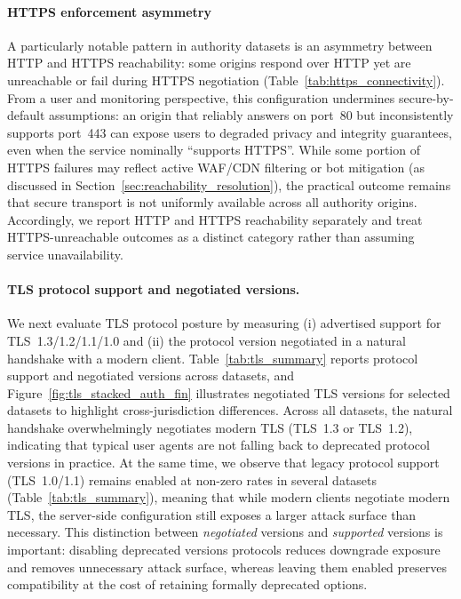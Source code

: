\documentclass[a4paper,fleqn]{cas-sc}
\begin{document}
  \paragraph{HTTPS enforcement asymmetry}
  A particularly notable pattern in authority datasets is an asymmetry between HTTP and HTTPS reachability: some origins respond over HTTP yet are unreachable or fail during HTTPS negotiation (Table~\ref{tab:https_connectivity}).
  From a user and monitoring perspective, this configuration undermines secure-by-default assumptions: an origin that reliably answers on port~80 but inconsistently supports port~443 can expose users to degraded privacy and integrity guarantees, even when the service nominally ``supports HTTPS''. 
  While some portion of HTTPS failures may reflect active WAF/CDN filtering or bot mitigation (as discussed in Section~\ref{sec:reachability_resolution}), the practical outcome remains that secure transport is not uniformly available across all authority origins.
  Accordingly, we report HTTP and HTTPS reachability separately and treat HTTPS-unreachable outcomes as a distinct category rather than assuming service unavailability.

\paragraph{TLS protocol support and negotiated versions.}
    We next evaluate TLS protocol posture by measuring 
    (i) advertised support for TLS~1.3/1.2/1.1/1.0 and 
    (ii) the protocol version negotiated in a natural handshake with a modern client. 
    Table~\ref{tab:tls_summary} reports protocol support and negotiated versions across datasets, and Figure~\ref{fig:tls_stacked_auth_fin} illustrates negotiated TLS versions for selected datasets to highlight cross-jurisdiction differences. 
    Across all datasets, the natural handshake overwhelmingly negotiates modern TLS (TLS~1.3 or TLS~1.2), indicating that typical user agents are not falling back to deprecated protocol versions in practice. 
    At the same time, we observe that legacy protocol support (TLS~1.0/1.1) remains enabled at non-zero rates in several datasets (Table~\ref{tab:tls_summary}), meaning that while modern clients negotiate modern TLS, the server-side configuration still exposes a larger attack surface than necessary. 
    This distinction between \emph{negotiated} versions and \emph{supported} versions is important: 
    disabling deprecated versions protocols reduces downgrade exposure and removes unnecessary attack surface, whereas leaving them enabled preserves compatibility at the cost of retaining formally deprecated options.
\end{document}
